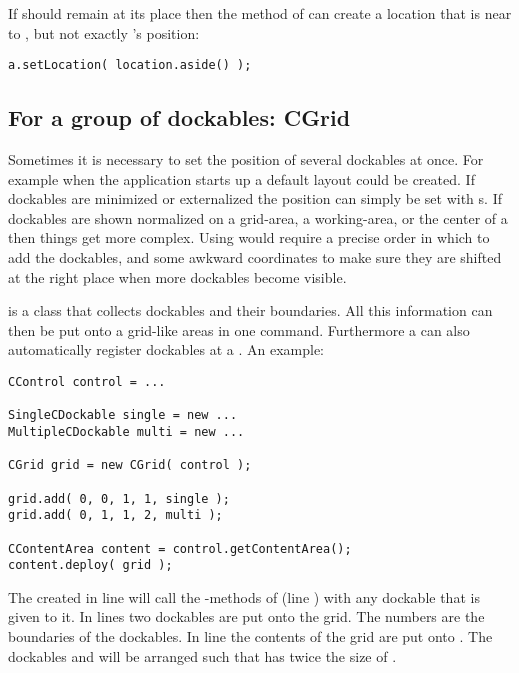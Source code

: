 If  should remain at its place then the method  of  can create a location that is near to , but not exactly 's position:
\begin{lstlisting}[firstnumber=5]
a.setLocation( location.aside() );
\end{lstlisting}


\subsection{For a group of dockables: CGrid}
Sometimes it is necessary to set the position of several dockables at once. For example when the application starts up a default layout could be created. If dockables are minimized or externalized the position can simply be set with s. If dockables are shown normalized on a grid-area, a working-area, or the center of a  then things get more complex. Using  would require a precise order in which to add the dockables, and some awkward coordinates to make sure they are shifted at the right place when more dockables become visible.

 is a class that collects dockables and their boundaries. All this information can then be put onto a grid-like areas in one command. Furthermore a  can also automatically register dockables at a . An example:
\begin{lstlisting}
CControl control = ...

SingleCDockable single = new ...
MultipleCDockable multi = new ...

CGrid grid = new CGrid( control );

grid.add( 0, 0, 1, 1, single );
grid.add( 0, 1, 1, 2, multi );

CContentArea content = control.getContentArea();
content.deploy( grid );
\end{lstlisting}
The  created in line  will call the -methods of  (line ) with any dockable that is given to it. In lines  two dockables are put onto the grid. The numbers are the boundaries of the dockables. In line  the contents of the grid are put onto . The dockables  and  will be arranged such that  has twice the size of .

